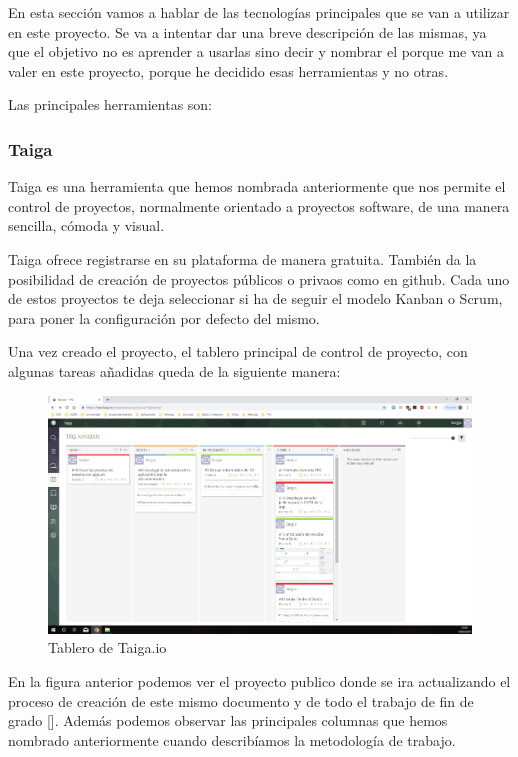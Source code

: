 En esta sección vamos a hablar de las tecnologías principales que se van a utilizar en este proyecto. Se va a intentar dar una breve descripción de las mismas, ya que el objetivo no es aprender a usarlas sino decir y nombrar el porque me van a valer en este proyecto, porque he decidido esas herramientas y no otras. 

Las principales herramientas son: 

\subsubsection{Taiga}
Taiga \cite{taiga} es una herramienta que hemos nombrada anteriormente que nos permite el control de proyectos, normalmente orientado a proyectos software, de una manera sencilla, cómoda y visual. 

Taiga ofrece registrarse en su plataforma de manera gratuita. También da la posibilidad de creación de proyectos públicos o privaos como en github. Cada uno de estos proyectos te deja seleccionar si ha de seguir el modelo Kanban o Scrum, para poner la configuración por defecto del mismo. 

Una vez creado el proyecto, el tablero principal de control de proyecto, con algunas tareas añadidas queda de la siguiente manera:

\begin{figure}[H]
    \centering
    \includegraphics[scale=0.3]{imagenes/fundamentosHerramientas/taiga.png}
    \caption{Tablero de Taiga.io}
    \label{fig:tableroTaiga}
\end{figure}

En la figura anterior podemos ver el proyecto publico donde se ira actualizando el proceso de creación de este mismo documento y de todo el trabajo de fin de grado []. Además podemos observar las principales columnas que hemos nombrado anteriormente cuando describíamos la metodología de trabajo. 

